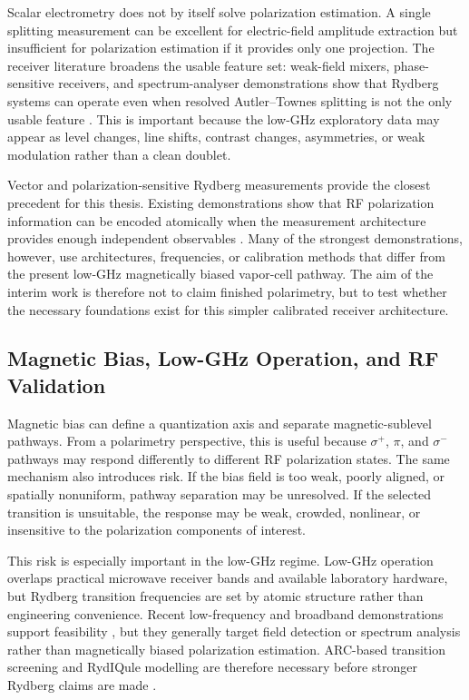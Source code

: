 \documentclass{ieeeaccess}
\begin{document}
Scalar electrometry does not by itself solve polarization estimation. A single splitting measurement can be excellent for electric-field amplitude extraction but insufficient for polarization estimation if it provides only one projection. The receiver literature broadens the usable feature set: weak-field mixers, phase-sensitive receivers, and spectrum-analyser demonstrations show that Rydberg systems can operate even when resolved Autler--Townes splitting is not the only usable feature \cite{Simons2019Mixer,Holloway2019PhaseModReceiver,Meyer2021Spectrum}. This is important because the low-GHz exploratory data may appear as level changes, line shifts, contrast changes, asymmetries, or weak modulation rather than a clean doublet.

Vector and polarization-sensitive Rydberg measurements provide the closest precedent for this thesis. Existing demonstrations show that RF polarization information can be encoded atomically when the measurement architecture provides enough independent observables \cite{Sedlacek2013,Wang2023Polarization,Gomes2024PolSpec,Elgee2024Polarimetry,Yin2024Polarization}. Many of the strongest demonstrations, however, use architectures, frequencies, or calibration methods that differ from the present low-GHz magnetically biased vapor-cell pathway. The aim of the interim work is therefore not to claim finished polarimetry, but to test whether the necessary foundations exist for this simpler calibrated receiver architecture.

\subsection{Magnetic Bias, Low-GHz Operation, and RF Validation}
\label{subsec:lit_bias_lowghz_rf}

Magnetic bias can define a quantization axis and separate magnetic-sublevel pathways. From a polarimetry perspective, this is useful because \(\sigma^+\), \(\pi\), and \(\sigma^-\) pathways may respond differently to different RF polarization states. The same mechanism also introduces risk. If the bias field is too weak, poorly aligned, or spatially nonuniform, pathway separation may be unresolved. If the selected transition is unsuitable, the response may be weak, crowded, nonlinear, or insensitive to the polarization components of interest.

This risk is especially important in the low-GHz regime. Low-GHz operation overlaps practical microwave receiver bands and available laboratory hardware, but Rydberg transition frequencies are set by atomic structure rather than engineering convenience. Recent low-frequency and broadband demonstrations support feasibility \cite{Hu2022Tunable,Rotunno2023VHF}, but they generally target field detection or spectrum analysis rather than magnetically biased polarization estimation. ARC-based transition screening and RydIQule modelling are therefore necessary before stronger Rydberg claims are made \cite{Sibalic2017ARC,Rydiqule2024}.
\end{document}
